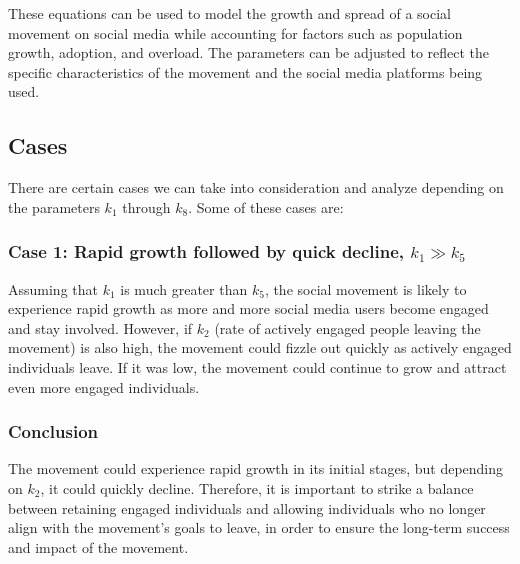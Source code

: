 \documentclass{article}
\begin{document}
	These equations can be used to model the growth and spread of a social movement on social media while accounting for factors such as population growth, adoption, and overload. The parameters can be adjusted to reflect the specific characteristics of the movement and the social media platforms being used.
 

    \subsection{Cases}
    
    There are certain cases we can take into consideration and analyze depending on the parameters $k_1$ through $k_8$. Some of these cases are: 


    \subsubsection*{Case 1: Rapid growth followed by quick decline, $k_1 \gg k_5$} \normalfont
    \begin{tcolorbox}
    Assuming that $k_1$  is much greater than $k_5$, the social movement is likely to experience rapid growth as more and more social media users become engaged and stay involved. However, if $k_2$ (rate of actively engaged people leaving the movement) is also high, the movement could fizzle out quickly as actively engaged individuals leave. If it was low, the movement could continue to grow and attract even more engaged individuals.
    \subsubsection*{Conclusion}  The movement could experience rapid growth in its initial stages, but depending on $k_2$, it could quickly decline. Therefore, it is important to strike a balance between retaining engaged individuals and allowing individuals who no longer align with the movement's goals to leave, in order to ensure the long-term success and impact of the movement.
    \end{tcolorbox}
\end{document}
